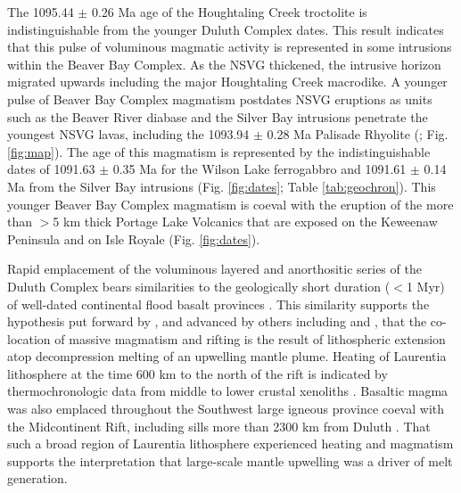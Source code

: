 \documentclass[11pt,letterpaper]{article}
\begin{document}
The 1095.44 $\pm$ 0.26 Ma age of the Houghtaling Creek troctolite is indistinguishable from the younger Duluth Complex dates. This result indicates that this pulse of voluminous magmatic activity is represented in some intrusions within the Beaver Bay Complex. As the NSVG thickened, the intrusive horizon migrated upwards including the major Houghtaling Creek macrodike. A younger pulse of Beaver Bay Complex magmatism postdates NSVG eruptions as units such as the Beaver River diabase and the Silver Bay intrusions penetrate the youngest NSVG lavas, including the 1093.94 $\pm$ 0.28 Ma Palisade Rhyolite (\citealp{Miller2001a, Swanson-Hysell2019a}; Fig. \ref{fig:map}). The age of this magmatism is represented by the indistinguishable dates of 1091.63 $\pm$ 0.35 Ma for the Wilson Lake ferrogabbro and 1091.61 $\pm$ 0.14 Ma from the Silver Bay intrusions (Fig. \ref{fig:dates}; Table \ref{tab:geochron}). This younger Beaver Bay Complex magmatism is coeval with the eruption of the more than $>$5 km thick Portage Lake Volcanics that are exposed on the Keweenaw Peninsula and on Isle Royale (Fig. \ref{fig:dates}).

Rapid emplacement of the voluminous layered and anorthositic series of the Duluth Complex bears similarities to the geologically short duration ($<$1 Myr) of well-dated continental flood basalt provinces \citep{Burgess2015a, Schoene2019a}. This similarity supports the hypothesis put forward by \cite{Green1983a}, and advanced by others including \cite{Cannon1992a} and \cite{Stein2015a}, that the co-location of massive magmatism and rifting is the result of lithospheric extension atop decompression melting of an upwelling mantle plume. Heating of Laurentia lithosphere at the time 600 km to the north of the rift is indicated by thermochronologic data from middle to lower crustal xenoliths \citep{Edwards2018a}. Basaltic magma was also emplaced throughout the Southwest large igneous province coeval with the Midcontinent Rift, including sills more than 2300 km from Duluth \citep{Bright2014a}. That such a broad region of Laurentia lithosphere experienced heating and magmatism supports the interpretation that large-scale mantle upwelling was a driver of melt generation.

\end{document}
